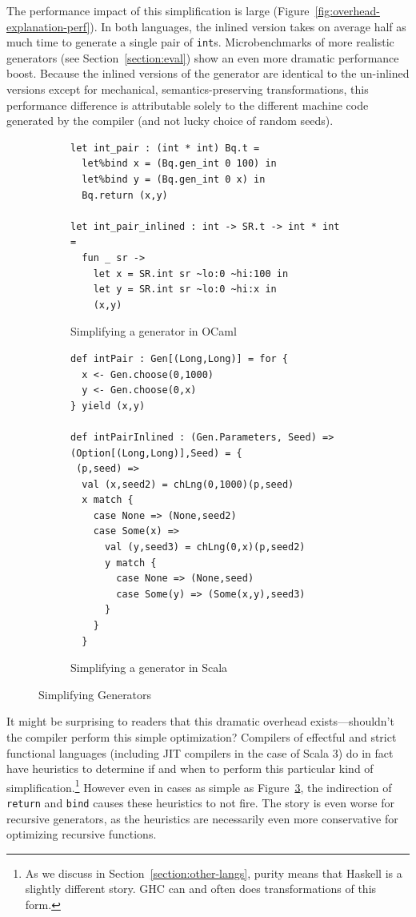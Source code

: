 \documentclass[acmsmall]{acmart}
\theoremstyle{definition}
\begin{document}
The performance impact of this simplification is large (Figure~\ref{fig:overhead-explanation-perf}). In both languages, the
inlined version takes on average half as much time to generate a single pair of
\texttt{int}s.
Microbenchmarks of more realistic generators (see Section~\ref{section:eval})
show an even more dramatic performance boost.
Because the inlined versions of the generator are identical to the un-inlined
versions except for mechanical, semantics-preserving transformations,
this performance difference is attributable solely to
the different machine code generated by the compiler (and not lucky choice of random seeds).

\begin{figure}[h]
  \begin{subfigure}{.49\textwidth}
\begin{lstlisting}
let int_pair : (int * int) Bq.t =
  let%bind x = (Bq.gen_int 0 100) in
  let%bind y = (Bq.gen_int 0 x) in
  Bq.return (x,y)

let int_pair_inlined : int -> SR.t -> int * int =
  fun _ sr ->
    let x = SR.int sr ~lo:0 ~hi:100 in
    let y = SR.int sr ~lo:0 ~hi:x in
    (x,y)
\end{lstlisting}
\caption{Simplifying a generator in OCaml}\label{fig:simplify-ocaml}
  \end{subfigure}
  \begin{subfigure}{.49\textwidth}
\begin{lstlisting}
def intPair : Gen[(Long,Long)] = for {
  x <- Gen.choose(0,1000)
  y <- Gen.choose(0,x)
} yield (x,y)

def intPairInlined : (Gen.Parameters, Seed) =>
(Option[(Long,Long)],Seed) = {
 (p,seed) =>
  val (x,seed2) = chLng(0,1000)(p,seed)
  x match {
    case None => (None,seed2)
    case Some(x) =>
      val (y,seed3) = chLng(0,x)(p,seed2)
      y match {
        case None => (None,seed)
        case Some(y) => (Some(x,y),seed3)
      }
    }
  }
\end{lstlisting}
\caption{Simplifying a generator in Scala}\label{fig:simplify-scala}
  \end{subfigure}
  \caption{Simplifying Generators}\label{fig:simplify}
\end{figure}

It might be surprising to readers that this dramatic overhead exists---shouldn't the compiler perform
this simple optimization? Compilers of effectful and strict functional languages (including JIT
compilers in the case of Scala 3)
do in fact have heuristics to determine if and when to perform this particular kind of
simplification.\footnote{As we discuss in Section~\ref{section:other-langs}, purity
means that Haskell is a slightly different story. GHC can and often does
transformations of this form.} However even in cases as simple as
Figure~\ref{fig:simplify}, the indirection of \texttt{return}
and \texttt{bind} causes these heuristics to not fire.  The story is
even worse for recursive generators, as the heuristics are necessarily even more
conservative for optimizing recursive functions.
\end{document}
